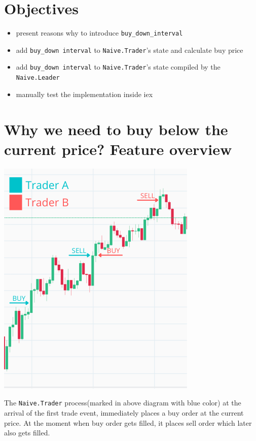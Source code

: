\documentclass[
  oneside]{book}
\providecommand{\tightlist}{%
  \setlength{\itemsep}{0pt}\setlength{\parskip}{0pt}}
\begin{document}
\hypertarget{objectives-5}{%
\section{Objectives}\label{objectives-5}}

\begin{itemize}
\tightlist
\item
  present reasons why to introduce \texttt{buy\_down\_interval}
\item
  add \texttt{buy\_down\ interval} to \texttt{Naive.Trader}'s state and calculate buy price
\item
  add \texttt{buy\_down\ interval} to \texttt{Naive.Trader}'s state compiled by the \texttt{Naive.Leader}
\item
  manually test the implementation inside iex
\end{itemize}

\hypertarget{why-we-need-to-buy-below-the-current-price-feature-overview}{%
\section{Why we need to buy below the current price? Feature overview}\label{why-we-need-to-buy-below-the-current-price-feature-overview}}

\includegraphics{images/chapter_06_01_current_buy_price.png}

The \texttt{Naive.Trader} process(marked in above diagram with blue color) at the arrival of the first trade event, immediately places a buy order at the current price. At the moment when buy order gets filled, it places sell order which later also gets filled.
\end{document}

